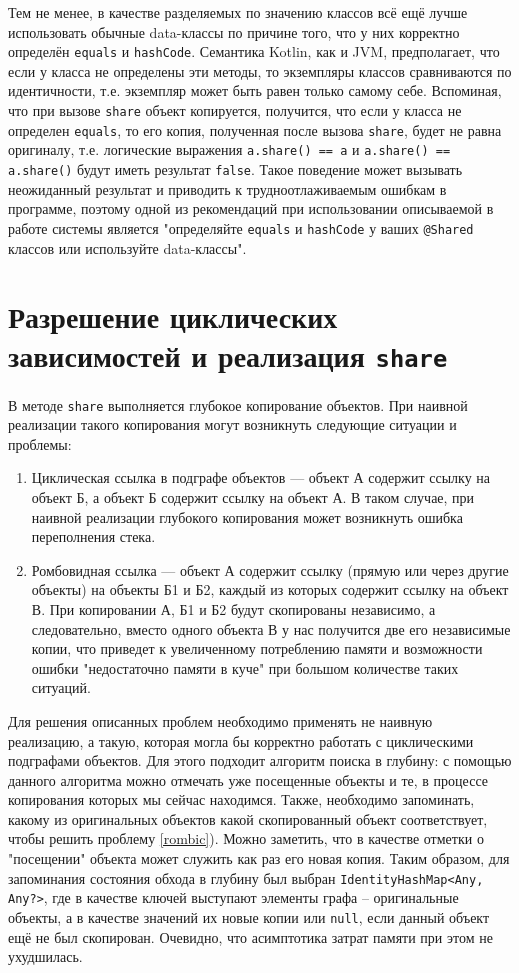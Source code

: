 \documentclass[specification,annotation,times]{itmo-student-thesis}
\begin{document}
Тем не менее, в качестве разделяемых по значению классов всё ещё лучше использовать обычные data-классы по причине того, что у них корректно определён \texttt{equals} и \texttt{hashCode}. Семантика Kotlin, как и JVM, предполагает, что если у класса не определены эти методы, то экземпляры классов сравниваются по идентичности, т.е. экземпляр может быть равен только самому себе.
Вспоминая, что при вызове \texttt{share} объект копируется, получится, что если у класса не определен \texttt{equals}, то его копия, полученная после вызова \texttt{share}, будет не равна оригиналу, т.е. логические выражения \texttt{a.share() == a} и \texttt{a.share() == a.share()} будут иметь результат \texttt{false}.
Такое поведение может вызывать неожиданный результат и приводить к трудноотлаживаемым ошибкам в программе, поэтому одной из рекомендаций при использовании описываемой в работе системы является "определяйте \texttt{equals} и \texttt{hashCode} у ваших \texttt{@Shared} классов или используйте data-классы".


\section{Разрешение циклических зависимостей и реализация \texttt{share}}

В методе \texttt{share} выполняется глубокое копирование объектов. При наивной реализации такого копирования могут возникнуть следующие ситуации и проблемы:

\begin{enumerate}
	\item \label{cyclic} Циклическая ссылка в подграфе объектов --- объект А содержит ссылку на объект Б, а объект Б содержит ссылку на объект А. В таком случае, при наивной реализации глубокого копирования может возникнуть ошибка переполнения стека.
	\item \label{rombic} Ромбовидная ссылка --- объект А содержит ссылку (прямую или через другие объекты) на объекты Б1 и Б2, каждый из которых содержит ссылку на объект В. При копировании А, Б1 и Б2 будут скопированы независимо, а следовательно, вместо одного объекта В у нас получится две его независимые копии, что приведет к увеличенному потреблению памяти и возможности ошибки "недостаточно памяти в куче" при большом количестве таких ситуаций.
\end{enumerate}

Для решения описанных проблем необходимо применять не наивную реализацию,
а такую, которая могла бы корректно работать с циклическими подграфами объектов.
Для этого подходит алгоритм поиска в глубину: с помощью данного алгоритма можно отмечать уже посещенные объекты и те, в процессе копирования которых мы сейчас находимся.
Также, необходимо запоминать, какому из оригинальных объектов какой скопированный объект соответствует, чтобы решить проблему \ref{rombic}). 
Можно заметить, что в качестве отметки о "посещении" объекта может служить как раз его новая копия.
Таким образом, для запоминания состояния обхода в глубину был выбран \texttt{IdentityHashMap<Any, Any?>}, где в качестве ключей выступают элементы графа -- оригинальные объекты, а в качестве значений их новые копии или \texttt{null}, если данный объект ещё не был скопирован.
Очевидно, что асимптотика затрат памяти при этом не ухудшилась.
\end{document}
